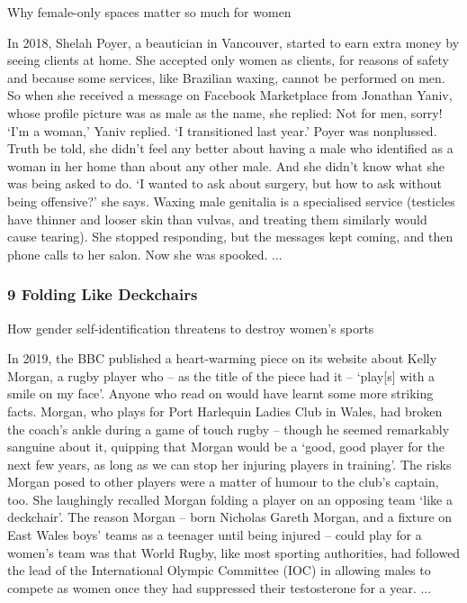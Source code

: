 \documentclass[10pt,titlepage]{book}
\begin{document}
Why female-only spaces matter so much for women

In 2018, Shelah Poyer, a beautician in Vancouver, started to earn extra money by seeing clients at home. She accepted only women as clients, for reasons of safety and because some services, like Brazilian waxing, cannot be performed on men. So when she received a message on Facebook Marketplace from Jonathan Yaniv, whose profile picture was as male as the name, she replied: Not for men, sorry! ‘I’m a woman,’ Yaniv replied. ‘I transitioned last year.’ Poyer was nonplussed. Truth be told, she didn’t feel any better about having a male who identified as a woman in her home than about any other male. And she didn’t know what she was being asked to do. ‘I wanted to ask about surgery, but how to ask without being offensive?’ she says. Waxing male genitalia is a specialised service (testicles have thinner and looser skin than vulvas, and treating them similarly would cause tearing). She stopped responding, but the messages kept coming, and then phone calls to her salon. Now she was spooked.
...

\subsubsection{9 Folding Like Deckchairs}

How gender self-identification threatens to destroy women’s sports

In 2019, the BBC published a heart-warming piece on its website about Kelly Morgan, a rugby player who – as the title of the piece had it – ‘play[s] with a smile on my face’. Anyone who read on would have learnt some more striking facts. Morgan, who plays for Port Harlequin Ladies Club in Wales, had broken the coach’s ankle during a game of touch rugby – though he seemed remarkably sanguine about it, quipping that Morgan would be a ‘good, good player for the next few years, as long as we can stop her injuring players in training’. The risks Morgan posed to other players were a matter of humour to the club’s captain, too. She laughingly recalled Morgan folding a player on an opposing team ‘like a deckchair’. The reason Morgan – born Nicholas Gareth Morgan, and a fixture on East Wales boys’ teams as a teenager until being injured – could play for a women’s team was that World Rugby, like most sporting authorities, had followed the lead of the International Olympic Committee (IOC) in allowing males to compete as women once they had suppressed their testosterone for a year.
...
\end{document}
